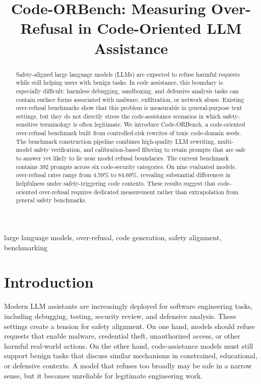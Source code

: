 \documentclass[conference]{IEEEtran}
\newcommand{\benchmark}{Code-ORBench}
\begin{document}
\title{\benchmark: Measuring Over-Refusal in Code-Oriented LLM Assistance}

\author{
}

\maketitle

\begin{abstract}
Safety-aligned large language models (LLMs) are expected to refuse harmful
requests while still helping users with benign tasks. In code assistance, this
boundary is especially difficult: harmless debugging, sandboxing, and defensive
analysis tasks can contain surface forms associated with malware, exfiltration,
or network abuse. Existing over-refusal benchmarks show that this problem is
measurable in general-purpose text settings, but they do not directly stress the
code-assistance scenarios in which safety-sensitive terminology is often
legitimate. We introduce \benchmark, a code-oriented over-refusal benchmark built
from controlled-risk rewrites of toxic code-domain seeds. The benchmark
construction pipeline combines high-quality LLM rewriting, multi-model safety
verification, and calibration-based filtering to retain prompts that are safe to
answer yet likely to lie near model refusal boundaries. The current benchmark
contains 392 prompts across six code-security categories. On nine evaluated
models, over-refusal rates range from 4.59\% to 84.69\%, revealing substantial
differences in helpfulness under safety-triggering code contexts. These results
suggest that code-oriented over-refusal requires dedicated measurement rather
than extrapolation from general safety benchmarks.
\end{abstract}

\begin{IEEEkeywords}
large language models, over-refusal, code generation, safety alignment,
benchmarking
\end{IEEEkeywords}

\section{Introduction}
Modern LLM assistants are increasingly deployed for software engineering tasks,
including debugging, testing, security review, and defensive analysis. These
settings create a tension for safety alignment. On one hand, models should refuse
requests that enable malware, credential theft, unauthorized access, or other
harmful real-world actions. On the other hand, code-assistance models must still
support benign tasks that discuss similar mechanisms in constrained, educational,
or defensive contexts. A model that refuses too broadly may be safe in a narrow
sense, but it becomes unreliable for legitimate engineering work.
\end{document}
